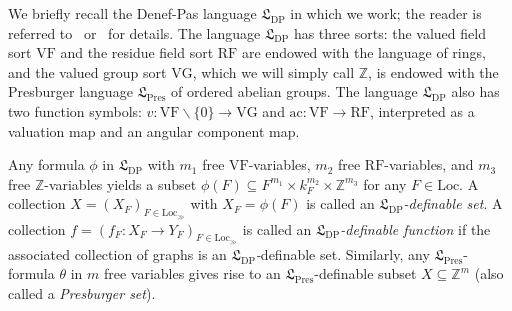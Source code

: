 \documentclass[11pt,a4paper]{amsart}
\theoremstyle{plain}
\theoremstyle{remark}
\begin{document}
We briefly recall the Denef-Pas language $\mathfrak{L}_{\mathrm{DP}}$ in which we work; the reader is referred to~\cite[\S4.1]{CGH/14} or~\cite[\S2]{BDOP/11} for details. 
The language $\mathfrak{L}_{\mathrm{DP}}$ has three sorts: the valued field sort $\mathrm{VF}$ and the
residue field sort $\mathrm{RF}$ are endowed with the language of
rings, and the valued group sort $\mathrm{VG}$, which we will simply call
$\mathbb{Z}$, is endowed with the {Presburger language} $\mathfrak{L}_{\mathrm{Pres}}$ of ordered abelian groups.
The language $\mathfrak{L}_{\mathrm{DP}}$ also has two function
symbols: $v:\mathrm{VF}\backslash\{0\}\rightarrow\mathrm{VG}$ and
$\mathrm{ac}:\mathrm{VF}\rightarrow\mathrm{RF}$, interpreted as a
valuation map and an angular component map.

Any formula $\phi$ in $\mathfrak{L}_{\mathrm{DP}}$ with $m_{1}$
free $\mathrm{VF}$-variables, $m_{2}$ free $\mathrm{RF}$-variables,
and $m_{3}$ free $\mathbb{Z}$-variables yields a subset $\phi(F)\subseteq F^{m_{1}}\times k_{F}^{m_{2}}\times\mathbb{Z}^{m_{3}}$
for any $F\in\mathrm{Loc}$.  A collection $X=(X_{F})_{F\in\mathrm{Loc}_{\gg}}$
with $X_{F}=\phi(F)$ is called an \textsl{$\mathfrak{L}_{\mathrm{DP}}$-definable
set}.  A collection $f=(f_{F}:X_{F}\rightarrow Y_{F})_{F\in\mathrm{Loc}_{\gg}}$
is called an \textsl{$\mathfrak{L}_{\mathrm{DP}}$-}\textit{definable
function} if the associated collection of graphs is an \textsl{$\mathfrak{L}_{\mathrm{DP}}$-}definable
set. Similarly, any $\mathfrak{L}_{\mathrm{Pres}}$-formula $\theta$ in $m$ free variables
gives rise to an $\mathfrak{L}_{\mathrm{Pres}}$-definable subset $X\subseteq\mathbb{Z}^{m}$
(also called a \emph{Presburger set}). 
\end{document}

